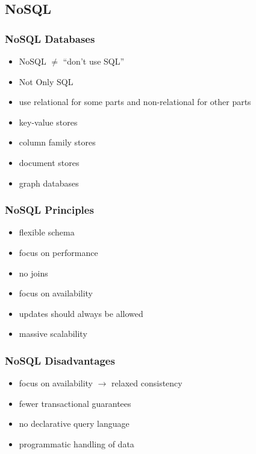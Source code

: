 \documentclass[dvipsnames]{beamer}
\theoremstyle{plain}
\begin{document}
\subsection{NoSQL}

\begin{frame}
  \frametitle{NoSQL Databases}

  \begin{itemize}
    \item NoSQL $\neq$ ``don't use SQL''
    \item Not Only SQL
    \item use relational for some parts and non-relational for other parts

    \pause
    \medskip
    \item key-value stores
    \item column family stores
    \item document stores
    \item graph databases
  \end{itemize}
\end{frame}

\begin{frame}
  \frametitle{NoSQL Principles}

  \begin{itemize}
    \item flexible schema

    \medskip
    \item focus on performance
    \item no joins

    \medskip
    \item focus on availability
    \item updates should always be allowed

    \medskip
    \item massive scalability
  \end{itemize}
\end{frame}

\begin{frame}
  \frametitle{NoSQL Disadvantages}

  \begin{itemize}
    \item focus on availability $\rightarrow$ relaxed consistency
    \item fewer transactional guarantees

    \pause
    \medskip
    \item no declarative query language
    \item programmatic handling of data
  \end{itemize}
\end{frame}
\end{document}
